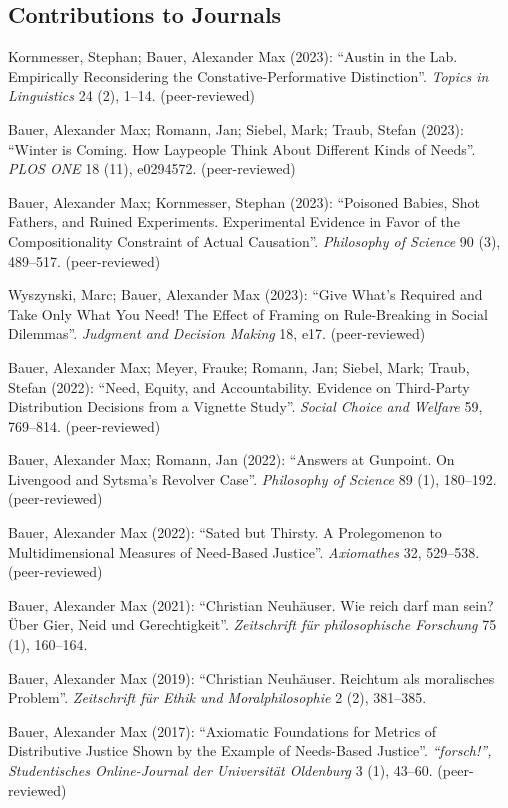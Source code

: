 \documentclass[a4paper,10pt]{article}
\newenvironment{literature}{%
   \parskip6pt\parindent0pt\raggedright
   \def\lititem{\hangindent=1cm\hangafter1}}{%
   \par\ignorespaces}
\begin{document}
\subsection*{Contributions to Journals}
\begin{literature}
\lititem Kornmesser, Stephan; Bauer, Alexander Max (2023): \enquote{Austin in the Lab. Empirically Reconsidering the Constative-Performative Distinction}. \textit{Topics in Linguistics} 24 (2), 1--14. (peer-reviewed)

\lititem Bauer, Alexander Max; Romann, Jan; Siebel, Mark; Traub, Stefan (2023): \enquote{Winter is Coming. How Laypeople Think About Different Kinds of Needs}. \textit{PLOS ONE} 18 (11), e0294572. (peer-reviewed)

\lititem Bauer, Alexander Max; Kornmesser, Stephan (2023): \enquote{Poisoned Babies, Shot Fathers, and Ruined Experiments. Experimental Evidence in Favor of the Compositionality Constraint of Actual Causation}. \textit{Philosophy of Science} 90 (3), 489--517. (peer-reviewed)

\lititem Wyszynski, Marc; Bauer, Alexander Max (2023): \enquote{Give What's Required and Take Only What You Need! The Effect of Framing on Rule-Breaking in Social Dilemmas}. \textit{Judgment and Decision Making} 18, e17. (peer-reviewed)

\lititem Bauer, Alexander Max; Meyer, Frauke; Romann, Jan; Siebel, Mark; Traub, Stefan (2022): \enquote{Need, Equity, and Accountability. Evidence on Third-Party Distribution Decisions from a Vignette Study}. \textit{Social Choice and Welfare} 59, 769--814. (peer-reviewed)

\lititem Bauer, Alexander Max; Romann, Jan (2022): \enquote{Answers at Gunpoint. On Livengood and Sytsma's Revolver Case}. \textit{Philosophy of Science} 89 (1), 180--192. (peer-reviewed)

\lititem Bauer, Alexander Max (2022): \enquote{Sated but Thirsty. A Prolegomenon to Multidimensional Measures of Need-Based Justice}. \textit{Axiomathes} 32, 529--538. (peer-reviewed)

\lititem Bauer, Alexander Max (2021): \enquote{Christian Neuhäuser. Wie reich darf man
sein? Über Gier, Neid und Gerechtigkeit}. \textit{Zeitschrift für philosophische Forschung} 75 (1), 160--164.

\lititem Bauer, Alexander Max (2019): \enquote{Christian Neuhäuser. Reichtum als moralisches Problem}. \textit{Zeitschrift für Ethik und Moralphilosophie} 2 (2), 381--385.

\lititem Bauer, Alexander Max (2017): \enquote{Axiomatic Foundations for Metrics of Distributive Justice Shown by the Example of Needs-Based Justice}. \textit{\enquote{forsch!}, Studentisches Online-Journal der Universität Oldenburg} 3 (1), 43--60. (peer-reviewed)


\end{literature}
\end{document}
